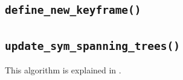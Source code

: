 \documentclass[a4paper,11pt]{article}
\begin{document}
\newpage
\subsection{\texttt{define\_new\_keyframe()}}
\label{sect:code:define_new_keyframe}




\newpage
\subsection{\texttt{update\_sym\_spanning\_trees()}}

This algorithm is explained in \cite{blanco2013srba}.






\newpage


\end{document}
